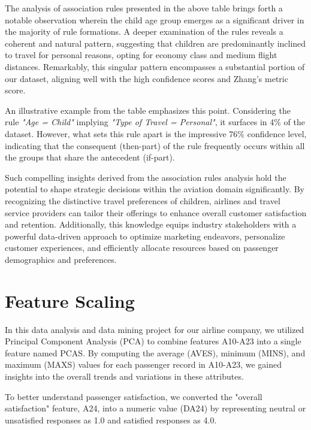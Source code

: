 \documentclass[11pt]{article}
\begin{document}
The analysis of association rules presented in the above table brings forth a notable observation wherein the child age group emerges as a significant driver in the majority of rule formations. A deeper examination of the rules reveals a coherent and natural pattern, suggesting that children are predominantly inclined to travel for personal reasons, opting for economy class and medium flight distances. Remarkably, this singular pattern encompasses a substantial portion of our dataset, aligning well with the high confidence scores and Zhang's metric score.

An illustrative example from the table emphasizes this point. Considering the rule \emph{"Age = Child"} implying \emph{"Type of Travel = Personal"}, it surfaces in 4\% of the dataset. However, what sets this rule apart is the impressive 76\% confidence level, indicating that the consequent (then-part) of the rule frequently occurs within all the groups that share the antecedent (if-part).

Such compelling insights derived from the association rules analysis hold the potential to shape strategic decisions within the aviation domain significantly. By recognizing the distinctive travel preferences of children, airlines and travel service providers can tailor their offerings to enhance overall customer satisfaction and retention. Additionally, this knowledge equips industry stakeholders with a powerful data-driven approach to optimize marketing endeavors, personalize customer experiences, and efficiently allocate resources based on passenger demographics and preferences.

        
    \hypertarget{question-5}{%
\section{Feature Scaling}\label{question-5}}

In this data analysis and data mining project for our airline company, we utilized Principal Component Analysis (PCA) to combine features A10-A23 into a single feature named PCAS. By computing the average (AVES), minimum (MINS), and maximum (MAXS) values for each passenger record in A10-A23, we gained insights into the overall trends and variations in these attributes.

To better understand passenger satisfaction, we converted the "overall satisfaction" feature, A24, into a numeric value (DA24) by representing neutral or unsatisfied responses as 1.0 and satisfied responses as 4.0.
\end{document}
